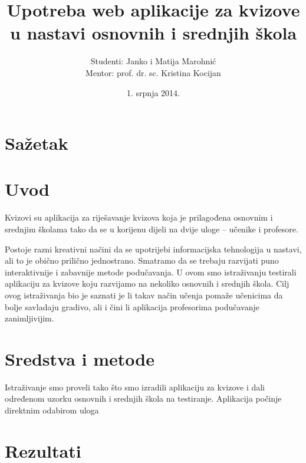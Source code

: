 \documentclass{scrreprt}
\begin{document}
\titlehead{Sveučilište u Zagrebu\\Filozofski fakultet\\Odsijek za informacijske
i komunikacijske znanosti\\Akademska godina 2013/14.}

\title{Upotreba web aplikacije za kvizove u nastavi osnovnih i srednjih škola}

\author{Studenti: Janko i Matija Marohnić\\Mentor: prof. dr. sc. Kristina
Kocijan}

\date{1. srpnja 2014.}

\maketitle

\tableofcontents

\chapter{Sažetak}

\chapter{Uvod}

Kvizovi su aplikacija za riješavanje kvizova koja je prilagođena osnovnim i
srednjim školama tako da se u korijenu dijeli na dvije uloge -- učenike i
profesore.

Postoje razni kreativni načini da se upotrijebi informacijska tehnologija u
nastavi, ali to je obično prilično jednostrano. Smatramo da se trebaju razvijati
puno interaktivnije i zabavnije metode podučavanja. U ovom smo istraživanju
testirali aplikaciju za kvizove koju razvijamo na nekoliko osnovnih i srednjih
škola. Cilj ovog istraživanja bio je saznati je li takav način učenja pomaže
učenicima da bolje savladaju gradivo, ali i čini li aplikacija profesorima
podučavanje zanimljivijim.

\chapter{Sredstva i metode}

Istraživanje smo proveli tako što smo izradili aplikaciju za kvizove i dali
određenom uzorku osnovnih i srednjih škola na testiranje. Aplikacija počinje
direktnim odabirom uloga \cite{lamport94}

\chapter{Rezultati}
\end{document}
